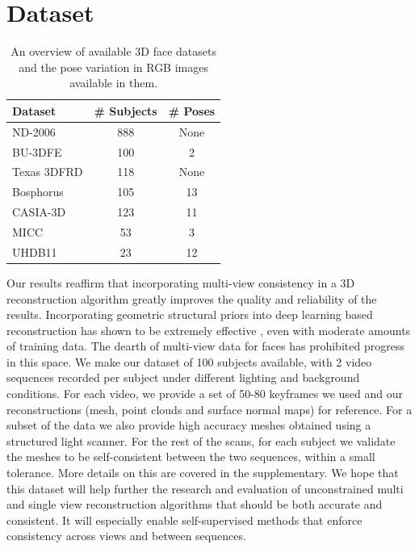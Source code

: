 \documentclass[10pt,twocolumn,letterpaper]{article}
\begin{document}
\section{Dataset}
\begin{table}
\begin{center}
\begin{tabular}{|l|c| c|}
\hline
Dataset & \# Subjects & \# Poses \\
\hline\hline
ND-2006 & 888 & None \\
BU-3DFE & 100 & 2 \\
Texas 3DFRD & 118 & None\\
Bosphorus & 105 & 13\\
CASIA-3D & 123 & 11\\
MICC & 53 & 3\\
UHDB11 & 23 & 12\\
\hline
\end{tabular}
\end{center}
\caption{An overview of available 3D face datasets and the pose variation in RGB images available in them.}
\end{table}

Our results reaffirm that incorporating multi-view consistency in a 3D reconstruction algorithm greatly improves the quality and reliability of the results. Incorporating geometric structural priors into deep learning based reconstruction has shown to be extremely effective \cite{yao2018mvsnet}, even with moderate amounts of training data. The dearth of multi-view data for faces has prohibited progress in this space. We make our dataset of 100 subjects available, with 2 video sequences recorded per subject under different lighting and background conditions. For each video, we provide a set of 50-80 keyframes we used and our reconstructions (mesh, point clouds and surface normal maps) for reference. For a subset of the data we also provide high accuracy meshes obtained using a structured light scanner. For the rest of the scans, for each subject we validate the meshes to be self-consistent between the two sequences, within a small tolerance. More details on this are covered in the supplementary.
We hope that this dataset will help further the research and evaluation of unconstrained multi and single view reconstruction algorithms that should be both accurate and consistent. It will especially enable self-supervised methods that enforce consistency across views and between sequences.
\end{document}
